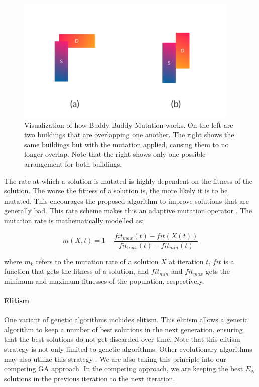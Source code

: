 \begin{figure}[h!]
	\centering
	\includegraphics{./images/chap06-validation/buddy-buddy-mutation.png}
	\caption{Visualization of how Buddy-Buddy Mutation works. On the left are two buildings that are overlapping one another. The right shows the same buildings but with the mutation applied, causing them to no longer overlap. Note that the right shows only one possible arrangement for both buildings.}
	\label{buddy-buddy-mutation-viz}
\end{figure}

The rate at which a solution is mutated is highly dependent on the fitness of the solution. The worse the fitness of a solution is, the more likely it is to be mutated. This encourages the proposed algorithm to improve solutions that are generally bad. This rate scheme makes this an adaptive mutation operator \cite{Jiang2018}. The mutation rate is mathematically modelled as:

\begin{equation}
	m(X, t) = 1 - \frac{fit_{max}(t) - fit(X(t))}{fit_{max}(t) - fit_{min}(t)}
\end{equation}

where $m_{k}$ refers to the mutation rate of a solution $X$ at iteration $t$, $fit$ is a function that gets the fitness of a solution, and $fit_{min}$ and $fit_{max}$ gets the minimum and maximum fitnesses of the population, respectively.

\paragraph{Elitism}
One variant of genetic algorithms includes elitism. This elitism allows a genetic algorithm to keep a number of best solutions in the next generation, ensuring that the best solutions do not get discarded over time. Note that this elitism strategy is not only limited to genetic algorithms. Other evolutionary algorithms may also utilize this strategy \cite{Du2018}. We are also taking this principle into our competing GA approach. In the competing approach, we are keeping the best $E_{N}$ solutions in the previous iteration to the next iteration.

